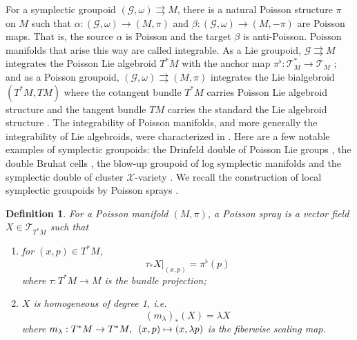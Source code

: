 \documentclass{amsart}
\newtheorem{definition}[theorem]{Definition}
\newcommand{\cG}{\mathcal{G}}
\newcommand{\cT}{\mathcal{T}}
\newcommand{\cX}{\mathcal{X}}
\newcommand{\rra}{\rightrightarrows}
\begin{document}
For a symplectic groupoid $(\cG, \omega) \rra M$, there is a natural Poisson structure $\pi$ on $M$ such that $\alpha: (\cG, \omega) \to (M, \pi)$ and $\beta: (\cG, \omega) \to (M, -\pi)$ are Poisson maps. That is, the source $\alpha$ is Poisson and the target $\beta$ is anti-Poisson. Poisson manifolds that arise this way are called integrable. As a Lie groupoid, $\cG \rra M$ integrates the Poisson Lie algebroid $T^*M$ with the anchor map $\pi^\flat: \cT^*_M \to \cT_M$ \cite{MR866024}; and as a Poisson groupoid, $(\cG, \omega) \rra (M, \pi)$ integrates the Lie bialgebroid $(T^*M, TM)$ where the cotangent bundle $T^*M$ carries Poisson Lie algebroid structure and the tangent bundle $TM$ carries the standard the Lie algebroid structure \cite{MR1262213}. The integrability of Poisson manifolds, and more generally the integrability of Lie algebroids, were characterized in \cite{MR1973056, MR2128714}. Here are a few notable examples of symplectic groupoids: the Drinfeld double of Poisson Lie groups \cite{MR1054741}, the double Bruhat cells \cite{LuM16}, the blow-up groupoid of log symplectic manifolds \cite{MR3214314} and the symplectic double of cluster $\cX$-variety \cite{MR2470108}. We recall the construction of local symplectic groupoids by Poisson sprays \cite{MR2900786, CMS17}.

\begin{definition}
For a Poisson manifold $(M, \pi)$, a Poisson spray is a vector field $X \in \cT_{T^*M}$ such that
	\begin{enumerate}
		\item for $(x,p) \in T^*M$,
			$$
				\tau_* X|_{(x,p)} = \pi^\flat(p)
			$$
			where $\tau: T^*M \to M$ is the bundle projection;
		\item
			$X$ is homogeneous of degree 1, i.e.
			$$
				(m_\lambda)_*(X) = \lambda X 
			$$
			where $m_\lambda: T^*M \to T^*M, \enskip (x,p) \mapsto (x,\lambda p)$ is the fiberwise scaling map.
	\end{enumerate}
\end{definition}
\end{document}
